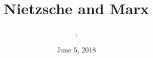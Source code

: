 \documentclass[xcolor=dvipsnames]{beamer}
\title{Nietzsche and Marx}
\subtitle{{\CourseNumber}, {\CourseInst}}
\author{\CourseName}
\date{June 5, 2018}
\begin{document}
\begin{frame}
  \titlepage
\end{frame}


\end{document}
